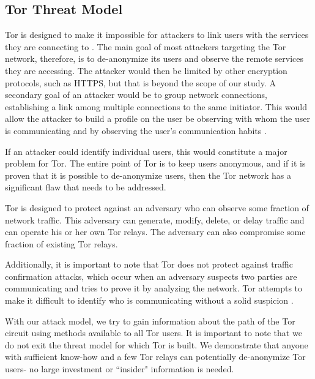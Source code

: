 \documentclass[12pt,journal]{IEEEtran}
\begin{document}
\subsection{Tor Threat Model}
Tor is designed to make it impossible for attackers to link users with the services they are connecting to \cite{Dingledine:2004:TSO:1251375.1251396}. The main goal of most attackers targeting the Tor network, therefore, is to de-anonymize its users and observe the remote services they are accessing. The attacker would then be limited by other encryption protocols, such as HTTPS, but that is beyond the scope of our study. A secondary goal of an attacker would be to group network connections, establishing a link among multiple connections to the same initiator. This would allow the attacker to build a profile on the user be observing with whom the user is communicating and by observing the user's communication habits \cite{Murdoch:2005:LTA:1058433.1059390}.
\par
If an attacker could identify individual users, this would constitute a major problem for Tor. The entire point of Tor is to keep users anonymous, and if it is proven that it is possible to de-anonymize users, then the Tor network has a significant flaw that needs to be addressed.
\par
Tor is designed to protect against an adversary who can observe some fraction of network traffic. This adversary can generate, modify, delete, or delay traffic and can operate his or her own Tor relays. The adversary can also compromise some fraction of existing Tor relays\cite{Dingledine:2004:TSO:1251375.1251396}.
\par
Additionally, it is important to note that Tor does not protect against traffic confirmation attacks, which occur when an adversary suspects two parties are communicating and tries to prove it by analyzing the network. Tor attempts to make it difficult to identify who is communicating without a solid suspicion \cite{Murdoch:2005:LTA:1058433.1059390}.
\par
With our attack model, we try to gain information about the path of the Tor circuit using methods available to all Tor users. It is important to note that we do not exit the threat model for which Tor is built. We demonstrate that anyone with sufficient know-how and a few Tor relays can potentially de-anonymize Tor users- no large investment or ``insider" information is needed.
\end{document}
